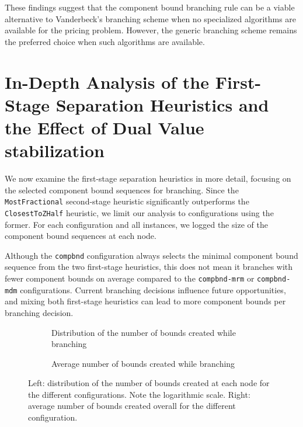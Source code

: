 These findings suggest that the component bound branching rule can be a viable alternative to Vanderbeck's branching scheme when no specialized algorithms are available for the pricing problem. However, the generic branching scheme remains the preferred choice when such algorithms are available.

\section{In-Depth Analysis of the First-Stage Separation Heuristics and the Effect of Dual Value stabilization}\label{sec:evaluation_comparison_separation_firststage}
We now examine the first-stage separation heuristics in more detail, focusing on the selected component bound sequences for branching. Since the \texttt{MostFractional} second-stage heuristic significantly outperforms the \texttt{ClosestToZHalf} heuristic, we limit our analysis to configurations using the former. For each configuration and all instances, we logged the size of the component bound sequences at each node.

Although the \texttt{compbnd} configuration always selects the minimal component bound sequence from the two first-stage heuristics, this does not mean it branches with fewer component bounds on average compared to the \texttt{compbnd-mrm} or \texttt{compbnd-mdm} configurations. Current branching decisions influence future opportunities, and mixing both first-stage heuristics can lead to more component bounds per branching decision.

\begin{figure}
	\centering

	\begin{subfigure}{0.495\textwidth}
		\centering
		
		\caption{Distribution of the number of bounds created while branching}
		\label{fig:compbnd_num_bounds}
	\end{subfigure}
	\hfill
	\begin{subfigure}{0.495\textwidth}
		\centering
		
		\caption{Average number of bounds created while branching}
		\label{fig:compbnd_avg_num_bounds}
	\end{subfigure}

	\caption{Left: distribution of the number of bounds created at each node for the different configurations. Note the logarithmic scale. Right: average number of bounds created overall for the different configuration.}
	\label{fig:comparison_bounds}
\end{figure}

